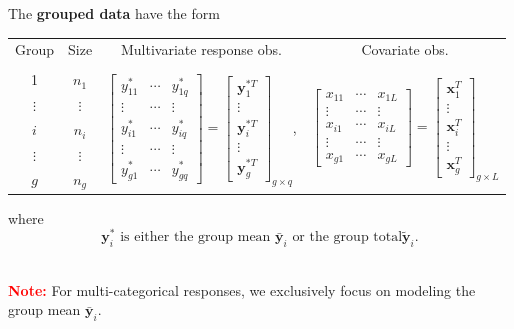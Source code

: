 \documentclass{beamer}
\begin{document}
\begin{frame}
The \textbf{grouped data} have the  form \vspace*{-12pt}
{\footnotesize 
\begin{center}
\begin{tabular}{cccc}
Group & Size& Multivariate response  obs. & Covariate obs.  \\ \\
1 & $n_1$ & \multirow{5}{*}{$\left[\!\begin{array}{ccc} y_{11}^* & \cdots & y_{1q}^* \\
\vdots & \cdots & \vdots \\ y_{i1}^* & \cdots & y_{iq}^* \\ \vdots & \cdots & \vdots \\ 
y_{g1}^* & \cdots & y_{gq}^* \end{array}\!\right]
=\left[\!\begin{array}{c} \textbf{y}_1^{*T} \\ \vdots \\ \textbf{y}_i^{*T} \\ \vdots 
\\ \textbf{y}_g^{*T}\end{array}\!\right]_{g\times q}$,} & 
\multirow{5}{*}{$\left[\!\begin{array}{ccc} x_{11} & \cdots & x_{1L} \\ 
\vdots & \cdots & \vdots \\ x_{i1} & \cdots & x_{iL} \\ \vdots & \cdots & \vdots \\ x_{g1} & \cdots & x_{gL}
\end{array}\!\right]=\left[\!\begin{array}{c} \textbf{x}_1^T \\ \vdots \\ \textbf{x}_i^T \\ \vdots 
\\ \textbf{x}_g^T\end{array}\!\right]_{g\times L}$} \\ $\vdots$ & $\vdots$ & & \\ $i$ & $n_i$ & & \\ 
$\vdots$ & $\vdots$ & & \\ $g$ & $n_g$ & &
\end{tabular}
\end{center}}
where 
\[
\text{$\textbf{y}_i^*$ is either the group mean $\bar{\textbf{y}}_i$ or the group total
$\tilde{\textbf{y}}_i$}.
\]
 \ \
 
{\bf \textcolor{red}{Note:}}  For multi-categorical responses, we   exclusively focus on modeling the group mean $\bar{\textbf{y}}_i$. 
\end{frame}
\end{document}
